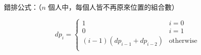 錯排公式：（$n$ 個人中，每個人皆不再原來位置的組合數）

$$
dp_i = \begin{cases}
    1 & i=0 \\
    0 & i=1 \\
    (i-1) (dp_{i-1}+dp_{i-2}) & \text{otherwise}\\
\end{cases}
$$